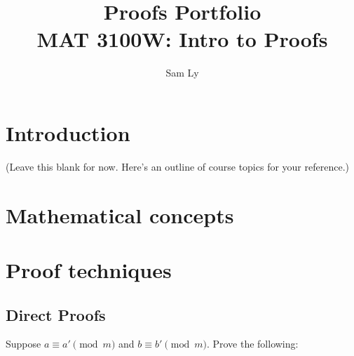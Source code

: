 \documentclass{article}
\title{Proofs Portfolio\\[5pt] \large MAT 3100W: Intro to Proofs}
\author{Sam Ly}
\theoremstyle{definition}
\begin{document}
\maketitle

\section{Introduction}
(Leave this blank for now. Here's an outline of course topics for your reference.)

\section{Mathematical concepts}

\section{Proof techniques}

\subsection{Direct Proofs}
Suppose \(a \equiv a' \pmod{m}\) and \(b \equiv b' \pmod{m}\). Prove the
following:
\end{document}
